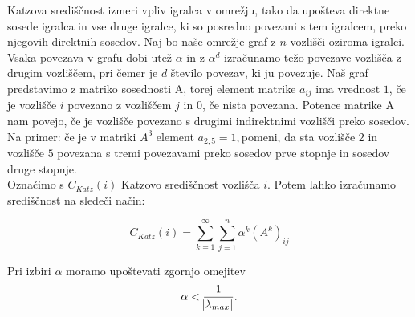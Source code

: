 \documentclass[a4paper]{article}
\begin{document}
Katzova središčnost izmeri vpliv igralca v omrežju, tako da upošteva direktne sosede igralca in vse druge igralce, ki so posredno povezani s tem igralcem, preko njegovih direktnih sosedov. Naj bo naše omrežje graf z $n$ vozlišči oziroma igralci. Vsaka povezava v grafu dobi utež $\alpha$ in z $\alpha^{d}$ izračunamo težo povezave vozlišča z drugim vozliščem, pri čemer je $d$ število povezav, ki ju povezuje. Naš graf predstavimo z matriko sosednosti A, torej element matrike $a_{ij}$ ima vrednost $1$, če je vozlišče $i$ povezano z vozliščem $j$ in $0$, če nista povezana. Potence matrike A nam povejo, če je vozlišče povezano s drugimi indirektnimi vozlišči preko sosedov. Na primer: če je v matriki $A^{3}$ element $a_{2,5}  = 1,$pomeni, da sta vozlišče $2$ in vozlišče $5$ povezana s tremi povezavami preko sosedov prve stopnje in sosedov druge stopnje. \\
Označimo s $C_{Katz}(i)$ Katzovo središčnost vozlišča $i$. Potem lahko izračunamo središčnost na sledeči način:

$$C_{Katz}(i) = \sum_{k=1}^{\infty}\sum_{j=1}^{n}\alpha^{k}(A^{k})_{ij}$$

Pri izbiri $\alpha$ moramo upoštevati zgornjo omejitev $$\alpha < \frac{1}{\abs{\lambda_{max}}}.$$
\end{document}
